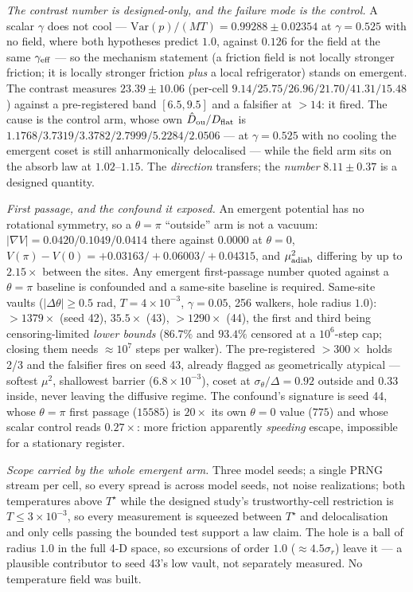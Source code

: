 \emph{The contrast number is designed-only, and the failure mode is the control.} A scalar $\gamma$ does not cool --- $\mathrm{Var}(p)/(MT)=0.99288\pm0.02354$ at $\gamma=0.525$ with no field, where both hypotheses predict $1.0$, against $0.126$ for the field at the same $\gamma_{\rm eff}$ --- so the mechanism statement (a friction field is not locally stronger friction; it is locally stronger friction \emph{plus} a local refrigerator) stands on emergent. The contrast measures $23.39\pm10.06$ (per-cell $9.14/25.75/26.96/21.70/41.31/15.48$) against a pre-registered band $[6.5,9.5]$ and a falsifier at $>14$: it fired. The cause is the control arm, whose own $\hat D_{\rm ou}/D_{\rm flat}$ is $1.1768/3.7319/3.3782/2.7999/5.2284/2.0506$ --- at $\gamma=0.525$ with no cooling the emergent coset is still anharmonically delocalised --- while the field arm sits on the absorb law at $1.02$--$1.15$. The \emph{direction} transfers; the \emph{number} $8.11\pm0.37$ is a designed quantity.

\emph{First passage, and the confound it exposed.} An emergent potential has no rotational symmetry, so a $\theta=\pi$ ``outside'' arm is not a vacuum: $|\nabla V|=0.0420/0.1049/0.0414$ there against $0.0000$ at $\theta=0$, $V(\pi)-V(0)=+0.03163/+0.06003/+0.04315$, and $\mu^2_{\rm adiab}$ differing by up to $2.15\times$ between the sites. Any emergent first-passage number quoted against a $\theta=\pi$ baseline is confounded and a same-site baseline is required. Same-site vaults ($|\Delta\theta|\ge0.5$ rad, $T=4\times10^{-3}$, $\gamma=0.05$, 256 walkers, hole radius $1.0$): $>1379\times$ (seed 42), $35.5\times$ (43), $>1290\times$ (44), the first and third being censoring-limited \emph{lower bounds} ($86.7\%$ and $93.4\%$ censored at a $10^6$-step cap; closing them needs $\approx10^7$ steps per walker). The pre-registered $>300\times$ holds 2/3 and the falsifier fires on seed 43, already flagged as geometrically atypical --- softest $\mu^2$, shallowest barrier ($6.8\times10^{-3}$), coset at $\sigma_\theta/\Delta=0.92$ outside and $0.33$ inside, never leaving the diffusive regime. The confound's signature is seed 44, whose $\theta=\pi$ first passage ($15585$) is $20\times$ its own $\theta=0$ value ($775$) and whose scalar control reads $0.27\times$: more friction apparently \emph{speeding} escape, impossible for a stationary register.

\emph{Scope carried by the whole emergent arm.} Three model seeds; a single PRNG stream per cell, so every spread is across model seeds, not noise realizations; both temperatures above $T^\star$ while the designed study's trustworthy-cell restriction is $T\le3\times10^{-3}$, so every measurement is squeezed between $T^\star$ and delocalisation and only cells passing the bounded test support a law claim. The hole is a ball of radius $1.0$ in the full 4-D space, so excursions of order $1.0$ ($\approx4.5\sigma_r$) leave it --- a plausible contributor to seed 43's low vault, not separately measured. No temperature field was built.


